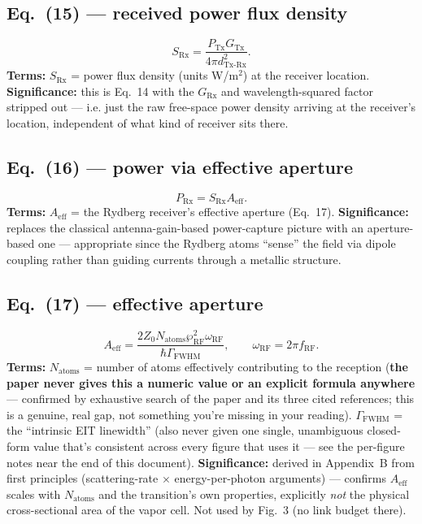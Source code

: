\documentclass[11pt]{article}
\begin{document}
\subsection*{Eq.~(15) --- received power flux density}
\begin{equation}
S_\text{Rx} = \frac{P_\text{Tx}G_\text{Tx}}{4\pi d_\text{Tx-Rx}^2}. \tag{15}
\end{equation}
\textbf{Terms:} $S_\text{Rx}$ = power flux density (units W/m$^2$) at
the receiver location.
\textbf{Significance:} this is Eq.~14 with the $G_\text{Rx}$ and
wavelength-squared factor stripped out --- i.e. just the raw
free-space power density arriving at the receiver's location,
independent of what kind of receiver sits there.

\subsection*{Eq.~(16) --- power via effective aperture}
\begin{equation}
P_\text{Rx} = S_\text{Rx}A_\text{eff}. \tag{16}
\end{equation}
\textbf{Terms:} $A_\text{eff}$ = the Rydberg receiver's effective
aperture (Eq.~17).
\textbf{Significance:} replaces the classical antenna-gain-based
power-capture picture with an aperture-based one --- appropriate since
the Rydberg atoms ``sense'' the field via dipole coupling rather than
guiding currents through a metallic structure.

\subsection*{Eq.~(17) --- effective aperture}
\begin{equation}
A_\text{eff} = \frac{2Z_0N_\text{atoms}\wp_\text{RF}^2\omega_\text{RF}}{\hbar\Gamma_\text{FWHM}}, \qquad \omega_\text{RF}=2\pi f_\text{RF}. \tag{17}
\end{equation}
\textbf{Terms:} $N_\text{atoms}$ = number of atoms effectively
contributing to the reception (\textbf{the paper never gives this a
numeric value or an explicit formula anywhere} --- confirmed by
exhaustive search of the paper and its three cited references; this is
a genuine, real gap, not something you're missing in your reading).
$\Gamma_\text{FWHM}$ = the ``intrinsic EIT linewidth'' (also never given
one single, unambiguous closed-form value that's consistent across
every figure that uses it --- see the per-figure notes near the end of
this document).
\textbf{Significance:} derived in Appendix~B from first principles
(scattering-rate $\times$ energy-per-photon arguments) --- confirms
$A_\text{eff}$ scales with $N_\text{atoms}$ and the transition's own
properties, explicitly \emph{not} the physical cross-sectional area of
the vapor cell. Not used by Fig.~3 (no link budget there).
\end{document}
